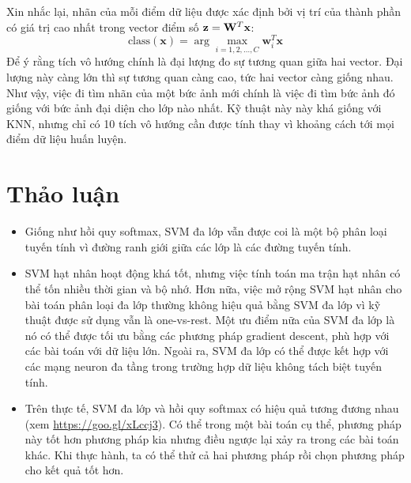 Xin nhắc lại, nhãn của mỗi điểm dữ liệu được xác định bởi vị trí của thành phần có giá trị cao nhất trong vector điểm số $\mathbf{z} = \mathbf{W}^T\mathbf{x}$:
\begin{equation*}
\text{class}(\mathbf{x}) = \arg\max_{i = 1, 2, \dots, C} \mathbf{w}_i^T\mathbf{x}
\end{equation*}
Để ý rằng tích vô hướng chính là đại lượng đo sự tương quan giữa hai vector. Đại
lượng này càng lớn thì sự tương quan càng cao, tức hai vector càng giống nhau.
Như vậy, việc đi tìm nhãn của một bức ảnh mới chính là việc đi tìm bức ảnh đó
giống với bức ảnh {đại diện} cho lớp nào nhất. Kỹ thuật này này khá giống
với KNN, nhưng chỉ có 10 tích vô hướng cần được tính thay vì khoảng cách tới mọi điểm dữ liệu huấn luyện.


\section{Thảo luận }
\begin{itemize}
\item Giống như hồi quy softmax, SVM đa lớp vẫn được coi là một bộ
phân loại tuyến tính vì đường ranh giới giữa các lớp là các đường tuyến tính.

\item SVM hạt nhân hoạt động khá tốt, nhưng việc tính toán ma trận hạt nhân có thể tốn nhiều thời gian và bộ nhớ. Hơn nữa, việc mở rộng SVM hạt nhân cho bài toán phân loại đa lớp thường không hiệu quả bằng SVM đa lớp
vì kỹ thuật được sử dụng vẫn là one-vs-rest. Một ưu điểm nữa của     SVM đa lớp là nó có thể được tối ưu bằng các phương pháp gradient descent, phù hợp
với các bài toán với dữ liệu lớn. Ngoài ra, SVM đa lớp có thể được kết hợp với các mạng neuron đa tầng trong trường hợp dữ liệu không tách biệt tuyến tính.


\item  Trên thực tế, SVM đa lớp và hồi quy softmax có hiệu quả tương
đương nhau (xem \url{https://goo.gl/xLccj3}). Có thể trong một bài toán cụ
thể, phương pháp này tốt hơn phương pháp kia nhưng điều ngược lại xảy ra
trong các bài toán khác. Khi thực hành, ta có thể thử cả hai
phương pháp rồi chọn phương pháp cho kết quả tốt hơn.
\end{itemize}







